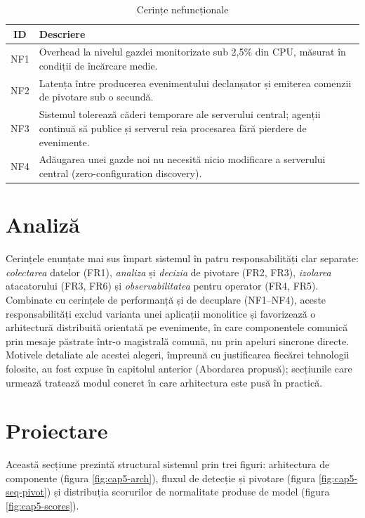 \begin{table}[h]
  \centering
  \caption{Cerințe nefuncționale}
  \label{tab:cap5-nfr}
  \renewcommand{\arraystretch}{1.08}
  \begin{tabular}{|c|p{}|}
    \hline
    \textbf{ID} & \textbf{Descriere} \\
    \hline\hline
    NF1 & Overhead la nivelul gazdei monitorizate sub 2,5\% din CPU, măsurat în condiții de încărcare medie. \\
    \hline
    NF2 & Latența între producerea evenimentului declanșator și emiterea comenzii de pivotare sub o secundă. \\
    \hline
    NF3 & Sistemul tolerează căderi temporare ale serverului central; agenții continuă să publice și serverul reia procesarea fără pierdere de evenimente. \\
    \hline
    NF4 & Adăugarea unei gazde noi nu necesită nicio modificare a serverului central (zero-configuration discovery). \\
    \hline
  \end{tabular}
\end{table}


\section{Analiză}


Cerințele enunțate mai sus împart sistemul în patru responsabilități clar
separate: \emph{colectarea} datelor (FR1), \emph{analiza} și \emph{decizia}
de pivotare (FR2, FR3), \emph{izolarea} atacatorului (FR3, FR6) și
\emph{observabilitatea} pentru operator (FR4, FR5). Combinate cu cerințele
de performanță și de decuplare (NF1--NF4), aceste responsabilități exclud
varianta unei aplicații monolitice și favorizează o arhitectură distribuită
orientată pe evenimente, în care componentele comunică prin mesaje păstrate
într-o magistrală comună, nu prin apeluri sincrone directe. Motivele
detaliate ale acestei alegeri, împreună cu justificarea fiecărei tehnologii
folosite, au fost expuse în capitolul anterior (Abordarea propusă); secțiunile
care urmează tratează modul concret în care arhitectura este pusă în practică.


\section{Proiectare}


Această secțiune prezintă structural sistemul prin trei figuri:
arhitectura de componente (figura \ref{fig:cap5-arch}), fluxul de detecție
și pivotare (figura \ref{fig:cap5-seq-pivot}) și distribuția scorurilor de
normalitate produse de model (figura \ref{fig:cap5-scores}).

